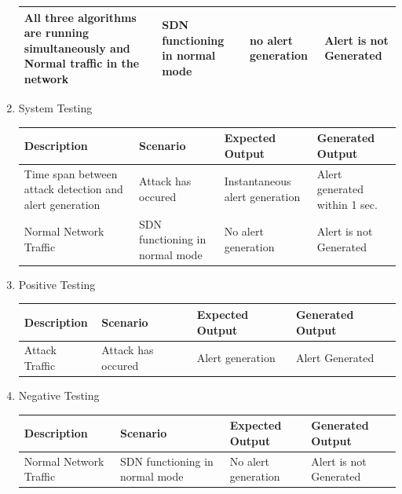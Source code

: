 \documentclass[12pt,a4paper,final]{report}
\begin{document}
\begin{enumerate}
\begin{tabular}{|p{3.5cm}|p{2.9cm}|p{2.5cm}|p{2.5cm}|}
	All three algorithms are running simultaneously and Normal traffic in the network & SDN functioning in normal mode & no alert generation & Alert is not Generated\\
	\hline
	
	\end{tabular}
	\linebreak
\newpage	
\item \begin{flushleft}
System Testing 
\end{flushleft} 
	\begin{tabular}{|p{3.5cm}|p{2.9cm}|p{2.5cm}|p{2.5cm}|}
	\hline 
	\textbf{Description} & \textbf{Scenario} & \textbf{Expected Output} & \textbf{Generated 		Output}\\ 
	\hline
	
	Time span between attack detection and alert generation & Attack has occured & Instantaneous alert generation & Alert generated within 1 sec.\\
	\hline
	
	Normal Network Traffic & SDN functioning in normal mode & No alert generation & Alert is not Generated\\
	\hline
	
	\end{tabular}
	
	
\item \begin{flushleft}
Positive Testing 
\end{flushleft} 
	\begin{tabular}{|p{3.5cm}|p{2.9cm}|p{2.5cm}|p{2.5cm}|}
	\hline 
	\textbf{Description} & \textbf{Scenario} & \textbf{Expected Output} & \textbf{Generated 		Output}\\ 
	\hline
	
	Attack Traffic & Attack has occured & Alert generation & Alert Generated\\
	\hline
	
	\end{tabular}
	\linebreak
	
\item \begin{flushleft}
Negative Testing 
\end{flushleft} 
	\begin{tabular}{|p{3.5cm}|p{2.9cm}|p{2.5cm}|p{2.5cm}|}
	\hline 
	\textbf{Description} & \textbf{Scenario} & \textbf{Expected Output} & \textbf{Generated 		Output}\\ 
	\hline
	
	 Normal Network Traffic & SDN functioning in normal mode & No alert generation & Alert is not Generated \\
	 \hline	
	
	\end{tabular}

\end{enumerate}
\end{document}
